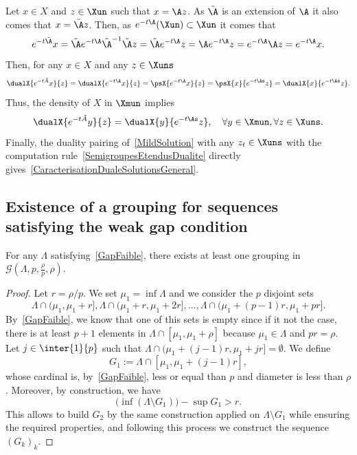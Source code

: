 Let $x \in X$ and $z \in \Xun$ such that $x= \A z$. As $\tilde{\A}$ is an extension of $\A$ it also comes that $x = \tilde{\A}z$. Then, as $e^{-t \A} (\Xun) \subset \Xun$ it comes that
\[
e^{-t \tilde{\A}}x = \tilde{\A} e^{-t \A} \tilde{\A}^{-1} \tilde{\A} z = \tilde{\A} e^{-t \A} z = \A e^{-t \A} z = e^{-t \A} \A z = e^{-t \A}x.
\]
Then, for any $x \in X$ and any $z \in \Xuns$
\[
\dualX{e^{-t \tilde{A}} x }{z} = \dualX{e^{-t\A} x}{z} = \psX{e^{-t\A}x}{z} = \psX{x}{e^{-t \As} z} = \dualX{x}{e^{-t \As}z}.
\]
Thus, the density of $X$ in $\Xmun$ implies
\begin{equation}\label{SemigroupesEtendusDualite}
\dualX{e^{-t \tilde{A}} y }{z} = \dualX{y}{e^{-t \As}z}, \quad \forall y \in \Xmun, \forall z \in \Xuns.
\end{equation}
Finally, the duality pairing of~\eqref{MildSolution} with any $z_t \in \Xuns$ with the computation rule~\eqref{SemigroupesEtendusDualite} directly gives~\eqref{CaracterisationDualeSolutionsGeneral}.


\subsection{Existence of a grouping for sequences satisfying the weak gap condition}

\begin{prop}\label{Prop:Groupements}
For any $\Lambda$ satisfying~\eqref{GapFaible}, there exists at least one grouping in $\mathcal{G} \left(\Lambda, p,\frac{\rho}{p},\rho \right)$.
\end{prop}

\begin{proof}
Let $r=\rho/p$. We set $\mu_1=\inf \Lambda$ and we consider the $p$ disjoint sets
\[
\Lambda\cap (\mu_1,\mu_1+r], \Lambda\cap (\mu_1+r,\mu_1+2r], \dotsc, \Lambda\cap (\mu_1+(p-1)r,\mu_1+pr].
\]
By~\eqref{GapFaible}, we know that one of this sets is empty since if it not the case, there is at least $p+1$ elements in $\Lambda\cap [\mu_1,\mu_1+\rho]$ because $\mu_1\in \Lambda$ and $pr=\rho$. Let $j\in \inter{1}{p}$ such that $\Lambda\cap (\mu_1+(j-1)r,\mu_1+jr]= \emptyset$. We define
\[
G_1:=\Lambda\cap [\mu_1, \mu_1+(j-1)r],
\]
whose cardinal is, by~\eqref{GapFaible}, less or equal than $p$ and diameter is less than $\rho$. Moreover, by construction, we have
\[
\big(\inf (\Lambda\setminus G_1) \big) - \sup G_1 > r.
\]
This allows to build $G_2$ by the same construction applied on $\Lambda\setminus G_1$ while ensuring the required properties, and following this process we construct the sequence $(G_k)_k$.
\end{proof}



